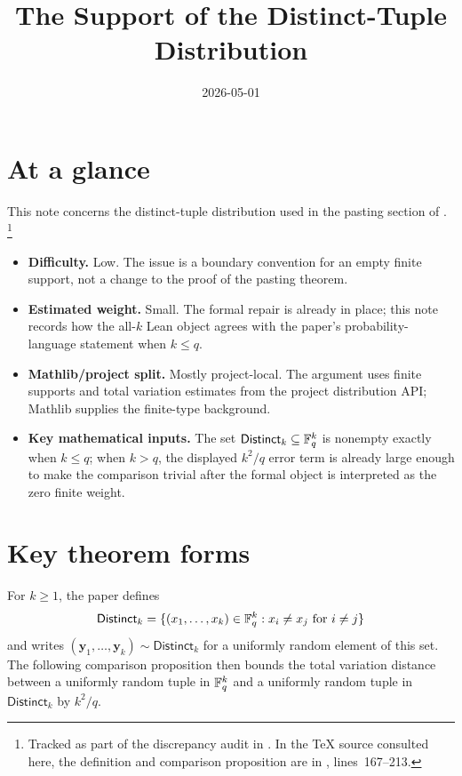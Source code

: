 \documentclass[11pt]{article}
\title{The Support of the Distinct-Tuple Distribution}
\author{}
\date{2026-05-01}
\begin{document}
\maketitle

\section{At a glance}

This note concerns the distinct-tuple distribution used in the pasting section of
\cite{Ji2020LowIndividualDegree}.%
\footnote{Tracked as part of the discrepancy audit in .  In the
TeX source consulted here, the definition and comparison proposition are in
, lines~167--213.}

\begin{itemize}
  \item \textbf{Difficulty.}  Low.  The issue is a boundary convention for an
  empty finite support, not a change to the proof of the pasting theorem.
  \item \textbf{Estimated weight.}  Small.  The formal repair is already in
  place; this note records how the all-\(k\) Lean object agrees with the
  paper's probability-language statement when \(k\le q\).
  \item \textbf{Mathlib/project split.}  Mostly project-local.  The argument
  uses finite supports and total variation estimates from the project
  distribution API; Mathlib supplies the finite-type background.
  \item \textbf{Key mathematical inputs.}  The set
  \(\mathsf{Distinct}_k\subseteq \mathbb{F}_q^k\) is nonempty exactly when \(k\le q\);
  when \(k>q\), the displayed \(k^2/q\) error term is already large enough to
  make the comparison trivial after the formal object is interpreted as the
  zero finite weight.
\end{itemize}

\section{Key theorem forms}

For \(k\ge 1\), the paper defines
\[
  \mathsf{Distinct}_k=\{(x_1,\ldots,x_k)\in \mathbb{F}_q^k: x_i\ne x_j
    \text{ for }i\ne j\}
\]
and writes $(\mathbf y_1,\ldots,\mathbf y_k)\sim \mathsf{Distinct}_k$ for a uniformly
random element of this set.  The following comparison proposition then bounds
the total variation distance between a uniformly random tuple in $\mathbb{F}_q^k$ and a
uniformly random tuple in $\mathsf{Distinct}_k$ by $k^2/q$.
\end{document}
